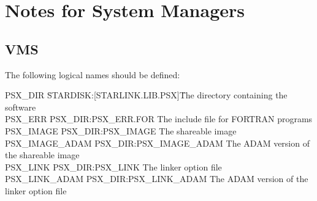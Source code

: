 \section{Notes for System Managers}

\subsection{VMS}

The following logical names should be defined:

\begin{small}
\begin{tabbing}
PSX\_DIR \hspace{6em}\= STARDISK:[STARLINK.LIB.PSX]\hspace{2em}\=The directory containing the software\\
PSX\_ERR \> PSX\_DIR:PSX\_ERR.FOR \> The include file for FORTRAN programs \\
PSX\_IMAGE \> PSX\_DIR:PSX\_IMAGE \> The shareable image \\
PSX\_IMAGE\_ADAM \> PSX\_DIR:PSX\_IMAGE\_ADAM \> The ADAM version of the shareable image \\
PSX\_LINK \> PSX\_DIR:PSX\_LINK \> The linker option file \\
PSX\_LINK\_ADAM \> PSX\_DIR:PSX\_LINK\_ADAM \> The ADAM version of the linker option file
\end{tabbing}
\end{small}


